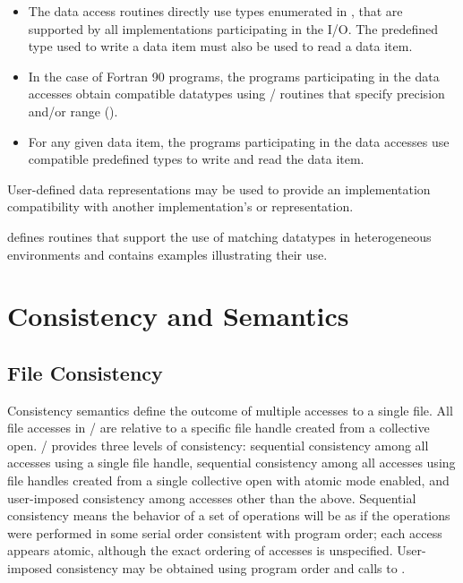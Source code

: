 
\begin{itemize}
\item The data access routines directly use types
      enumerated in ,
      that are supported
      by all implementations participating in the I/O.
      The predefined type used to write a data item
      must also be used to read a data item.
\item 
In the case of Fortran 90 programs, 
the programs participating in the data accesses
      obtain compatible datatypes using \MPI/ routines that
      specify precision and/or range ().
\item For any given data item, the programs participating in
      the data accesses use compatible predefined types to write and
      read the data item.
\end{itemize}

User-defined data representations may be used to provide
an implementation compatibility with another implementation's
 or  representation.

\begin{users}
defines routines that support the use of
matching datatypes in heterogeneous environments and contains examples
illustrating their use.
\end{users}

\section{Consistency and Semantics}
\label{sec:io-semantics}

\subsection{File Consistency}
\label{sec:io-filecntl-atomicity}
Consistency semantics define the outcome of multiple accesses
to a single file.
All file accesses in \MPI/ are relative to a specific file handle
created from a collective open.
\MPI/ provides three levels of consistency:
sequential consistency among all accesses using a single file handle,
sequential consistency among all accesses
using file handles created from a single collective open
with atomic mode enabled,
and
user-imposed consistency among accesses other than the above.
Sequential consistency means the behavior of a set of operations
will be as if the operations were performed in some serial order
consistent with program order; each access appears atomic,
although the exact ordering of accesses is unspecified.
User-imposed consistency may be obtained using program order
and calls to .

